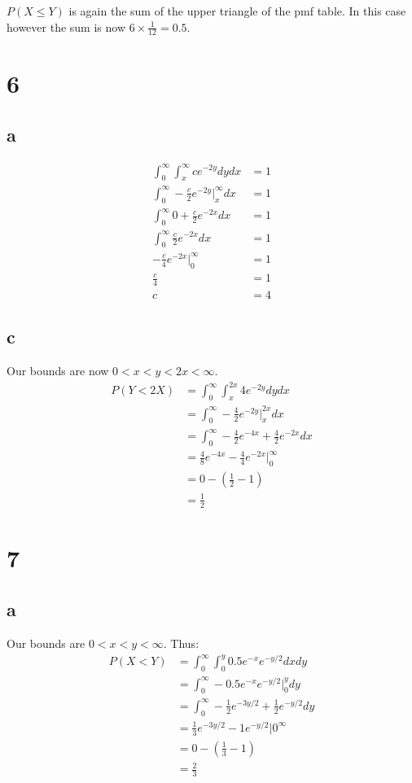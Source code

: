 \documentclass[10pt]{article}
\begin{document}
$P(X \le Y)$ is again the sum of the upper triangle of the pmf table. In this case however the sum is now $6\times\frac{1}{12}=0.5.$

\section*{6}
\subsection*{a}
\begin{align*}
    \int_0^\infty \int_x^\infty ce^{-2y} dydx &= 1\\
    \int_0^\infty -\frac{c}{2}e^{-2y} \Bigr |_x^\infty dx &= 1\\
    \int_0^\infty 0 + \frac{c}{2}e^{-2x}dx &= 1\\
    \int_0^\infty \frac{c}{2}e^{-2x}dx &= 1\\
    -\frac{c}{4}e^{-2x} \Bigr |_0^\infty &= 1\\
    \frac{c}{4} &= 1\\
    c &= 4
\end{align*}

\subsection*{c}
Our bounds are now $0<x<y<2x<\infty.$
\begin{align*}
    P(Y<2X) &= \int_0^\infty \int_x^{2x} 4e^{-2y} dydx\\
    &= \int_0^\infty -\frac{4}{2}e^{-2y} \Bigr |_x^{2x} dx\\
    &= \int_0^\infty -\frac{4}{2}e^{-4x} + \frac{4}{2}e^{-2x} dx\\
    &= \frac{4}{8}e^{-4x} - \frac{4}{4}e^{-2x} \Bigr |_0^\infty\\
    &= 0 - (\frac{1}{2} - 1)\\
    &= \frac{1}{2}
\end{align*}

\section*{7}
\subsection*{a}
Our bounds are $0<x<y<\infty.$ Thus:
\begin{align*}
    P(X<Y) &= \int_0^\infty\int_0^y 0.5e^{-x}e^{-y/2}dxdy\\
    &= \int_0^\infty -0.5e^{-x}e^{-y/2}\Bigr |_0^y dy\\
    &= \int_0^\infty -\frac{1}{2}e^{-3y/2} +  \frac{1}{2}e^{-y/2}dy\\
    &= \frac{1}{3}e^{-3y/2} - 1e^{-y/2} \Bigr |0^\infty\\
    &= 0 - (\frac{1}{3}-1)\\
    &= \frac{2}{3}
\end{align*}
\end{document}
